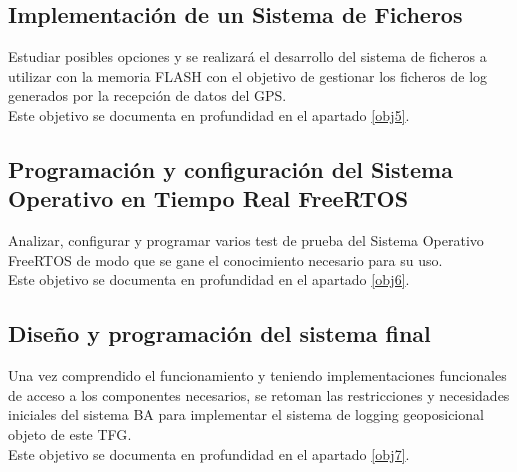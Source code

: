 \subsection{Implementación de un Sistema de Ficheros}
Estudiar posibles opciones y se realizará el desarrollo del sistema de ficheros a utilizar con la memoria FLASH con el objetivo de gestionar los ficheros de log generados por la recepción de datos del GPS.     \\                                             

Este objetivo se documenta en profundidad en el apartado \ref{obj5}.        

\subsection{Programación y configuración del Sistema Operativo en Tiempo Real FreeRTOS}
Analizar, configurar y programar varios test de prueba del Sistema Operativo FreeRTOS de modo que se gane el conocimiento necesario para su uso.             \\                                                                                                 

Este objetivo se documenta en profundidad en el apartado \ref{obj6}.        

\subsection{Diseño y programación del sistema final}
Una vez comprendido el funcionamiento y teniendo implementaciones funcionales de acceso a los componentes necesarios, se retoman las restricciones y necesidades iniciales del sistema \acs{BA} para implementar el sistema de logging geoposicional objeto de este \acs{TFG}. \\

Este objetivo se documenta en profundidad en el apartado \ref{obj7}.        

